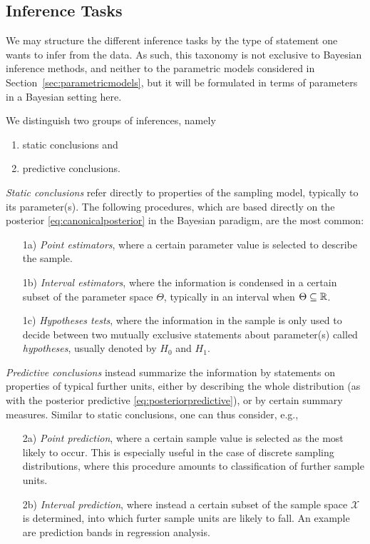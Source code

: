 \subsection{Inference Tasks}
\label{sec:inferencetasks}

We may structure the different inference tasks by
the type of statement one wants to infer from the data.
As such, this taxonomy is not exclusive to Bayesian inference methods,
and neither to the parametric models considered in Section~\ref{sec:parametricmodels},
but it will be formulated in terms of parameters in a Bayesian setting here.

We distinguish two groups of inferences, namely
\begin{enumerate}
\item static conclusions and
\item predictive conclusions.%
\end{enumerate}

\emph{Static conclusions} refer directly to properties of the sampling model, typically to its parameter(s).
The following procedures, which are based directly on the posterior \eqref{eq:canonicalposterior} in the Bayesian paradigm,
are the most common:
\begin{enumerate}
\item[1a)] \emph{Point estimators},
where a certain parameter value is selected to describe the sample.
\item[1b)] \emph{Interval estimators},
where the information is condensed in a certain subset of the parameter space $\Theta$, typically in an interval when $\Theta \subseteq \mathbb{R}$.
\item[1c)] \emph{Hypotheses tests},
where the information in the sample is only used to decide between two mutually exclusive statements about parameter(s) called \emph{hypotheses},
usually denoted by $H_0$ and $H_1$.
\end{enumerate}

\emph{Predictive conclusions} instead summarize the information by statements on properties of typical further units,
either by describing the whole distribution (as with the posterior predictive \eqref{eq:posteriorpredictive}),
or by certain summary measures.
Similar to static conclusions, one can thus consider, e.g.,
\begin{enumerate}
\item[2a)] \emph{Point prediction},
where a certain sample value is selected as the most likely to occur.
This is especially useful in the case of discrete sampling distributions,
where this procedure amounts to classification of further sample units.
\item[2b)] \emph{Interval prediction},
where instead a certain subset of the sample space $\mathcal{X}$ is determined,
into which furter sample units are likely to fall.
An example are prediction bands in regression analysis.
\end{enumerate}

